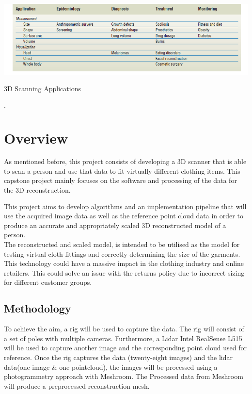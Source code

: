 \documentclass[12pt]{report}
\begin{document}
\begin{table}[ht]
    \centering
    \includegraphics[width=15cm]{table1.png}
    \caption{3D Scanning Applications}\cite[]{treleaven_wells_2007}.
\end{table}

\section{Overview}
As mentioned before, this project consists of developing a 3D scanner that is able to scan a person and use that data to fit virtually different clothing items.
This capstone project mainly focuses on the software and processing of the data for the 3D reconstruction.

This project aims to develop algorithms and an implementation pipeline that will use the acquired image data as well as the reference point cloud data in order to produce an accurate
and appropriately scaled 3D reconstructed model of a person.\\
The reconstructed and scaled model, is intended to be utilised as the model for testing virtual cloth fittings and correctly determining the size of the garments. 
This technology could have a massive impact in the clothing industry and online retailers. This could solve an issue with the returns policy due to incorrect sizing for different customer groups.



\subsection{Methodology}
To achieve the aim, a rig will be used to capture the data. The rig will consist of a set of poles with multiple cameras. Furthermore, a Lidar Intel RealSense L515 will be used to capture another image and the corresponding point cloud used for reference.
Once the rig captures the data (twenty-eight images) and the lidar data(one image \& one pointcloud), the images will be processed using a photogrammetry approach with Meshroom. 
The Processed data from Meshroom will produce a preprocessed reconstruction mesh. 
\end{document}
